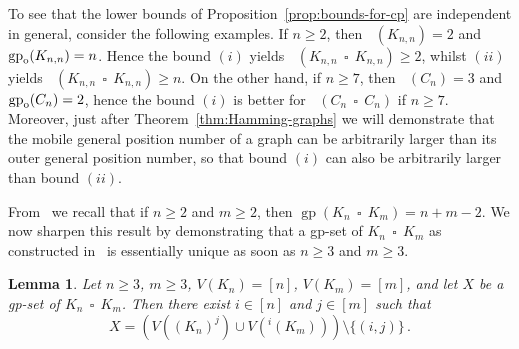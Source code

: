 \documentclass[a4paper,12pt]{article}
\DeclareMathOperator{\mob}{Mob_{gp}}
\DeclareMathOperator{\gp}{gp}
\DeclareMathOperator{\cp}{\,\square\,}
\newcommand{\gpo}{\gp_{\rm o}}
\newtheorem{lemma}[theorem]{Lemma}
\theoremstyle{definition}
\begin{document}
	To see that the lower bounds of Proposition~\ref{prop:bounds-for-cp} are independent in general, consider the following examples. If $n\ge 2$, then $\mob(K_{n,n}) = 2$ and $\gpo(K_{n,n}) = n$. Hence the bound $(i)$ yields $\mob(K_{n,n} \cp K_{n,n})\ge 2$, whilst $(ii)$ yields $\mob(K_{n,n} \cp K_{n,n}) \ge n$. On the other hand, if $n \ge 7$, then $\mob(C_n) = 3$ and $\gpo(C_n) = 2$, hence the bound $(i)$ is better for $\mob(C_{n} \cp C_{n})$ if $n \geq 7$. Moreover, just after Theorem~\ref{thm:Hamming-graphs} we will demonstrate that the mobile general position number of a graph can be arbitrarily larger than its outer general position number, so that bound $(i)$ can also be arbitrarily larger than bound $(ii)$.
	
	From~\cite[Theorem 3.2]{ghorbani-2021} we recall that if $n\ge 2$ and $m\ge 2$, then $\gp(K_n\cp K_m) = n + m - 2$. We now sharpen this result by demonstrating that a gp-set of $K_n\cp K_m$ as constructed in~\cite[Theorem 3.2]{ghorbani-2021} is essentially unique as soon as $n\ge 3$ and $m\ge 3$. 
	
	\begin{lemma}
		\label{lem:unique-gp-in-Hamming}
		Let $n\ge 3$, $m\ge 3$, $V(K_n) = [n]$, $V(K_m) = [m]$, and let $X$ be a gp-set of $K_n\cp K_m$. Then there exist $i\in [n]$ and $j\in [m]$ such that 
		$$X = \left( V((K_n)^j) \cup V(^i(K_m))\right )\setminus \{(i,j)\}\,.$$ 
	\end{lemma}
	
\end{document}

